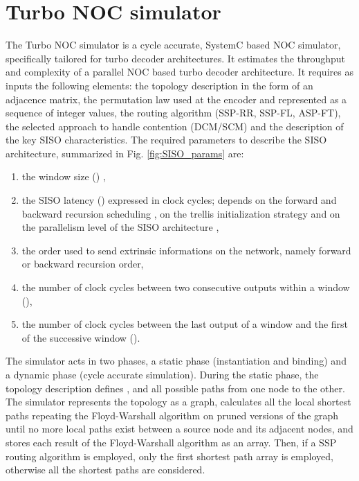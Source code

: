 \documentclass[10pt,twocolumn,journal]{IEEEtran}
\begin{document}
\section{Turbo NOC simulator}
\label{sec:tnoc}

The Turbo NOC simulator \cite{turbo_NOC_download} is a cycle accurate, SystemC \cite{SystemC} based NOC simulator, 
specifically tailored 
for turbo decoder architectures. It estimates the throughput and complexity of a parallel NOC based turbo decoder 
architecture. It requires as inputs the following elements: 
the topology description in the form of an adjacence matrix, the permutation law 
used at the encoder and represented as a sequence of integer values, the routing algorithm 
(SSP-RR, SSP-FL, ASP-FT), the selected approach to handle contention (DCM/SCM) and the description of the key SISO characteristics. 
The required parameters to describe the SISO architecture, summarized in Fig. \ref{fig:SISO_params} are:  
\begin{enumerate}
\item the window size () \cite{benedetto_EL96},
\item the SISO latency () expressed in clock cycles;  
depends on the forward and backward recursion scheduling
\cite{parhi_ISCAS04}, on the trellis initialization strategy \cite{yao_ICASSP03} and on the parallelism 
level of the SISO architecture \cite{muller_ICCTA06},
\item the order used to send extrinsic informations on the network, namely forward or backward recursion 
order,
\item the number of clock cycles between two consecutive outputs  within a window (), 
\item the number of clock cycles between the last output  of a window and the first  
of the successive window ().
\end{enumerate}
The simulator acts in two phases, a static phase (instantiation and binding) and a dynamic phase 
(cycle accurate simulation).
During the static phase, the topology description defines ,  and all possible paths from one node to the other. 
The simulator represents the topology as a graph, calculates all the local shortest paths repeating the Floyd-Warshall 
algorithm on pruned versions of the graph until no more local paths exist between a source node  and its adjacent 
nodes, and stores each result of the Floyd-Warshall algorithm as an array.
Then, if a SSP routing algorithm is employed, only the first shortest path array is employed, otherwise all the shortest 
paths are considered. 
\end{document}
